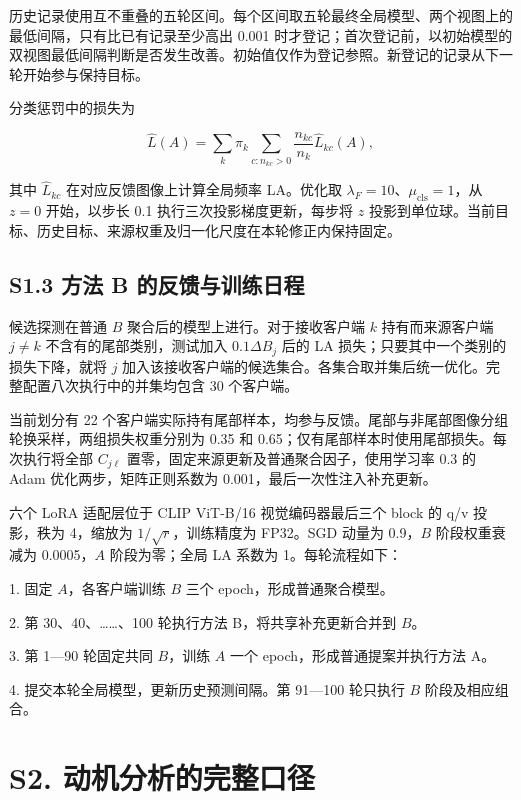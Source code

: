 \documentclass[10pt,twocolumn,letterpaper]{article}
\begin{document}
历史记录使用互不重叠的五轮区间。每个区间取五轮最终全局模型、两个视图上的最低间隔，只有比已有记录至少高出 0.001 时才登记；首次登记前，以初始模型的双视图最低间隔判断是否发生改善。初始值仅作为登记参照。新登记的记录从下一轮开始参与保持目标。


分类惩罚中的损失为


\begin{equation}\widehat L(A)=\sum_k\pi_k\sum_{c:n_{kc}>0}
\frac{n_{kc}}{n_k}\widehat L_{kc}(A),\end{equation}

其中 $\widehat L_{kc}$ 在对应反馈图像上计算全局频率 LA。优化取 $\lambda_F=10$、$\mu_{\mathrm{cls}}=1$，从 $z=0$ 开始，以步长 0.1 执行三次投影梯度更新，每步将 $z$ 投影到单位球。当前目标、历史目标、来源权重及归一化尺度在本轮修正内保持固定。


\subsection*{S1.3 方法 B 的反馈与训练日程}

候选探测在普通 $B$ 聚合后的模型上进行。对于接收客户端 $k$ 持有而来源客户端 $j\ne k$ 不含有的尾部类别，测试加入 $0.1\Delta B_j$ 后的 LA 损失；只要其中一个类别的损失下降，就将 $j$ 加入该接收客户端的候选集合。各集合取并集后统一优化。完整配置八次执行中的并集均包含 30 个客户端。


当前划分有 22 个客户端实际持有尾部样本，均参与反馈。尾部与非尾部图像分组轮换采样，两组损失权重分别为 0.35 和 0.65；仅有尾部样本时使用尾部损失。每次执行将全部 $C_{j\ell}$ 置零，固定来源更新及普通聚合因子，使用学习率 0.3 的 Adam 优化两步，矩阵正则系数为 0.001，最后一次性注入补充更新。


六个 LoRA 适配层位于 CLIP ViT-B/16 视觉编码器最后三个 block 的 q/v 投影，秩为 4，缩放为 $1/\sqrt r$，训练精度为 FP32。SGD 动量为 0.9，$B$ 阶段权重衰减为 0.0005，$A$ 阶段为零；全局 LA 系数为 1。每轮流程如下：


1. 固定 $A$，各客户端训练 $B$ 三个 epoch，形成普通聚合模型。


2. 第 30、40、……、100 轮执行方法 B，将共享补充更新合并到 $B$。


3. 第 1—90 轮固定共同 $B$，训练 $A$ 一个 epoch，形成普通提案并执行方法 A。


4. 提交本轮全局模型，更新历史预测间隔。第 91—100 轮只执行 $B$ 阶段及相应组合。


\section*{S2. 动机分析的完整口径}
\end{document}
